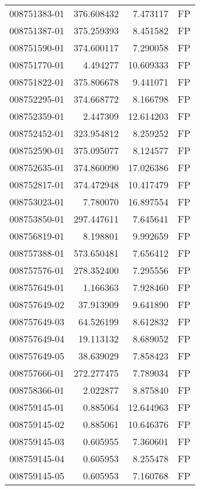\begin{tabular}{lrrl}
008751383-01 &  376.608432 &       7.473117 &   FP \\
008751387-01 &  375.259393 &       8.451582 &   FP \\
008751590-01 &  374.600117 &       7.290058 &   FP \\
008751770-01 &    4.494277 &      10.609333 &   FP \\
008751822-01 &  375.806678 &       9.441071 &   FP \\
008752295-01 &  374.668772 &       8.166798 &   FP \\
008752359-01 &    2.447309 &      12.614203 &   FP \\
008752452-01 &  323.954812 &       8.259252 &   FP \\
008752590-01 &  375.095077 &       8.124577 &   FP \\
008752635-01 &  374.860090 &      17.026386 &   FP \\
008752817-01 &  374.472948 &      10.417479 &   FP \\
008753023-01 &    7.780070 &      16.897554 &   FP \\
008753850-01 &  297.447611 &       7.645641 &   FP \\
008756819-01 &    8.198801 &       9.992659 &   FP \\
008757388-01 &  573.650481 &       7.656412 &   FP \\
008757576-01 &  278.352400 &       7.295556 &   FP \\
008757649-01 &    1.166363 &       7.928460 &   FP \\
008757649-02 &   37.913909 &       9.641890 &   FP \\
008757649-03 &   64.526199 &       8.612832 &   FP \\
008757649-04 &   19.113132 &       8.689052 &   FP \\
008757649-05 &   38.639029 &       7.858423 &   FP \\
008757666-01 &  272.277475 &       7.789034 &   FP \\
008758366-01 &    2.022877 &       8.875840 &   FP \\
008759145-01 &    0.885064 &      12.644963 &   FP \\
008759145-02 &    0.885061 &      10.646376 &   FP \\
008759145-03 &    0.605955 &       7.360601 &   FP \\
008759145-04 &    0.605953 &       8.255478 &   FP \\
008759145-05 &    0.605953 &       7.160768 &   FP \\

\end{tabular}
